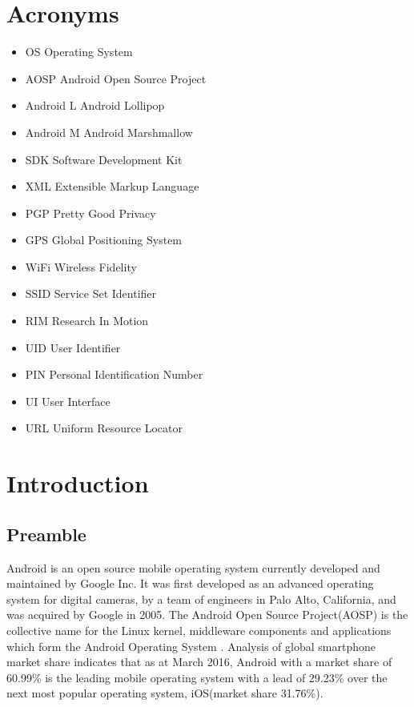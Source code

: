 
\chapter*{Acronyms}
\begin{itemize}
\item[] OS \tab \tab Operating System
\item[] AOSP \tab \tab Android Open Source Project
\item[] Android L \tab Android Lollipop
\item[] Android M \tab Android Marshmallow
\item[] SDK \tab \tab Software Development Kit
\item[] XML \tab \tab Extensible Markup Language
\item[] PGP \tab \tab Pretty Good Privacy
\item[] GPS \tab \tab Global Positioning System
\item[] WiFi \tab \tab Wireless Fidelity
\item[] SSID \tab \tab Service Set Identifier
\item[] RIM \tab \tab Research In Motion
\item[] UID \tab \tab User Identifier
\item[] PIN \tab \tab Personal Identification Number
\item[] UI \tab \tab User Interface
\item[] URL \tab \tab Uniform Resource Locator
\end{itemize}

\chapter{Introduction} \label{cha:intro}
\section{Preamble}

Android is an open source mobile operating system currently developed and maintained by Google Inc. It was first developed as an advanced operating system for digital cameras, by a team of engineers in Palo Alto, California, and was acquired by Google in 2005. The Android Open Source Project(AOSP) is the collective name for the Linux kernel, middleware components and  applications which form the Android Operating System \cite{a}. Analysis of global smartphone market share indicates that as at March 2016, Android with a market share of 60.99\% is the leading mobile operating system with a lead of 29.23\% over the next most popular operating system, iOS(market share 31.76\%)\cite{b}.
\smallskip

